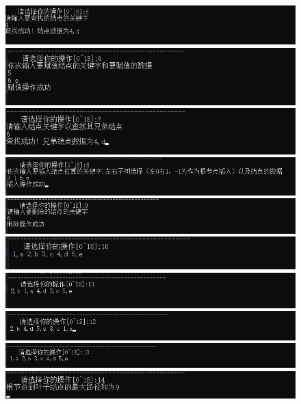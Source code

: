 \documentclass[supercite]{Experimental_Report}
\theoremstyle{definition}
\begin{document}
\begin{sloppypar}
\begin{figure}[H]
	\includegraphics[width=16cm]{pic3//5.png}
	\includegraphics[width=16cm]{pic3//6.png}
	\includegraphics[width=16cm]{pic3//7.png}
	\includegraphics[width=16cm]{pic3//8.png}
	\includegraphics[width=16cm]{pic3//9.png}
	\includegraphics[width=16cm]{pic3//10.png}
	\includegraphics[width=16cm]{pic3//11.png}
	\includegraphics[width=16cm]{pic3//12.png}
	\includegraphics[width=16cm]{pic3//13.png}
	\includegraphics[width=16cm]{pic3//14.png}


\end{figure}
\end{sloppypar}
\end{document}
